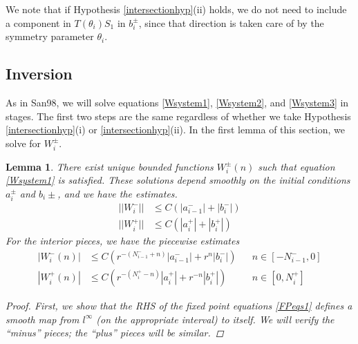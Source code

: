 \documentclass[12pt]{article}
\newtheorem{lemma}{Lemma}
\begin{document}
We note that if Hypothesis \ref{intersectionhyp}(ii) holds, we do not need to include a component in $T(\theta_i) S_1$ in $b_i^\pm$, since that direction is taken care of by the symmetry parameter $\theta_i$.

\subsection{Inversion}

As in San98, we will solve equations \eqref{Wsystem1}, \eqref{Wsystem2}, and \eqref{Wsystem3} in stages. The first two steps are the same regardless of whether we take Hypothesis \ref{intersectionhyp}(i) or \ref{intersectionhyp}(ii). In the first lemma of this section, we solve for $W_i^\pm$. 

\begin{lemma}\label{inv1}
There exist unique bounded functions $W_i^\pm(n)$ such that equation \eqref{Wsystem1} is satisfied. These solutions depend smoothly on the initial conditions $a_i^\pm$ and $b_i\pm$, and we have the estimates.
\begin{equation}\label{Wipmest}
\begin{aligned}
||W_i^-|| &\leq C (|a_{i-1}^-| + |b_i^-|) \\
||W_i^+|| &\leq C (|a_i^+| + |b_i^+| )
\end{aligned}
\end{equation}
For the interior pieces, we have the piecewise estimates
\begin{equation}\label{Wipiecewise}
\begin{aligned}
|W_i^-(n)| &\leq C (r^{-(N_{i-1}^- + n)}|a_{i-1}^-| + r^n|b_i^-|) && n \in [-N_{i-1}^-, 0] \\
|W_i^+(n)| &\leq C (r^{-(N_i^+ - n)}|a_i^+| + r^{-n}|b_i^+| ) && n \in [0, N_i^+] 
\end{aligned}
\end{equation}

\begin{proof}
First, we show that the RHS of the fixed point equations \eqref{FPeqs1} defines a smooth map from $l^\infty$ (on the appropriate interval) to itself. We will verify the ``minus'' pieces; the ``plus'' pieces will be similar.


\end{proof}
\end{lemma}
\end{document}
